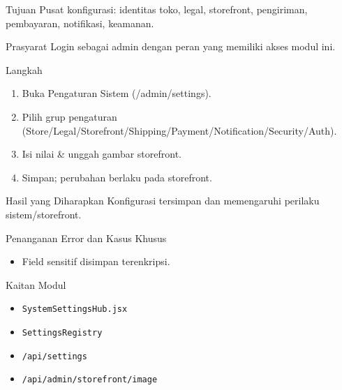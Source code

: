 
\begin{flowsection}{Tujuan}
Pusat konfigurasi: identitas toko, legal, storefront, pengiriman, pembayaran, notifikasi, keamanan.
\end{flowsection}

\begin{flowsection}{Prasyarat}
Login sebagai admin dengan peran yang memiliki akses modul ini.
\end{flowsection}

\begin{flowsection}{Langkah}
\begin{enumerate}
  \item Buka Pengaturan Sistem (/admin/settings).
  \item Pilih grup pengaturan (Store/Legal/Storefront/Shipping/Payment/Notification/Security/Auth).
  \item Isi nilai \&  unggah gambar storefront.
  \item Simpan; perubahan berlaku pada storefront.
\end{enumerate}
\end{flowsection}


\begin{flowsection}{Hasil yang Diharapkan}
Konfigurasi tersimpan dan memengaruhi perilaku sistem/storefront.
\end{flowsection}

\begin{flowsection}{Penanganan Error dan Kasus Khusus}
\begin{itemize}
  \item Field sensitif disimpan terenkripsi.
\end{itemize}
\end{flowsection}

\begin{flowsection}{Kaitan Modul}
\begin{itemize}
  \item \texttt{SystemSettingsHub.jsx}
  \item \texttt{SettingsRegistry}
  \item \texttt{/api/settings}
  \item \texttt{/api/admin/storefront/image}
\end{itemize}
\end{flowsection}

